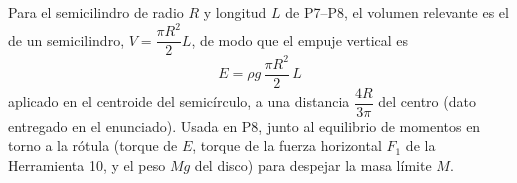 \documentclass[12pt]{article}
\begin{document}
Para el semicilindro de radio $R$ y longitud $L$ de P7--P8, el volumen relevante es el
de un semicilindro, $V=\dfrac{\pi R^2}{2}L$, de modo que el empuje vertical es
\[
\boxed{E=\rho g\,\frac{\pi R^2}{2}\,L}
\]
aplicado en el centroide del semic\'irculo, a una distancia $\dfrac{4R}{3\pi}$ del
centro (dato entregado en el enunciado). Usada en P8, junto al equilibrio de momentos
en torno a la r\'otula (torque de $E$, torque de la fuerza horizontal $F_1$ de la
Herramienta 10, y el peso $Mg$ del disco) para despejar la masa l\'imite $M$.
\end{document}
